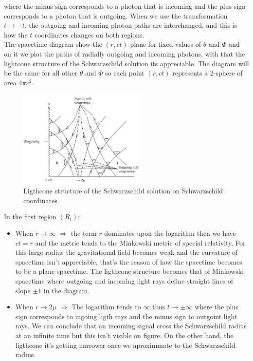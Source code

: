 \documentclass[letterpaper,11pt,onecolumn]{article}
\begin{document}
where the minus sign corresponds to a photon that is incoming and the plus sign corresponds to a photon that is outgoing. When we use the transformation $t\rightarrow -t$, the outgoing and incoming photon paths are interchanged, and this is how the $t$ coordinates changes on both regions.\\
The spacetime diagram show the $(r,ct)$-plane for fixed values of $\theta$ and $\Phi$ and on it we plot the paths of radially outgoing and incoming photons, with that the lightcone structure of the Schwarzschild solution its appreciable. The diagram will be the same for all other $\theta$ and $\Phi$ so each point $(r,ct)$ represents a $2$-sphere of area $4\pi r^2$.
\\
\begin{figure}[h!]
    \centering
    \includegraphics[width=0.58\textwidth]{Report/Images/4bhphotons.png}
    \caption{Ligthcone structure of the Schwarzschild solution on Schwarzschild coordinates.}
\label{fig3}
\end{figure}
In the first region $(R_{\mathrm{I}})$:
\begin{itemize}
\item When $r\rightarrow \infty$ $\Rightarrow$ the term $r$ dominates upon the logarithm then we have $ct=r$ and the metric tends to the Minkowski metric of special relativity. For this large radius the gravitational field becomes weak and the curvature of spacetime isn't appreciable, that's the reason of how the spacetime becomes to be a plane spacetime. The ligthcone structure becomes that of Minkowski spacetime where outgoing and incoming light rays define straight lines of slope $\pm1$ in the diagram.

\item When $r\rightarrow 2\mu$ $\Rightarrow$ The logarithm tends to $\infty$ thus $t\rightarrow \pm\infty$ where the plus sign corresponds to ingoing ligth rays and the minus sign to outgoint light rays. We can conclude that an incoming signal cross the Schwarzschild radius at an infinite time but this isn't visible on figure. On the other hand, the ligthcone it's getting narrower once we aproximmate to the Schwarzschild radius.\\

\end{itemize}
\end{document}
